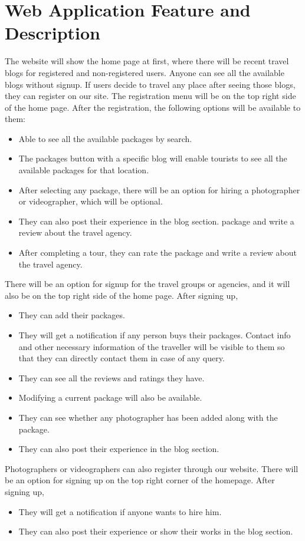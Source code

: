 \documentclass[12pt,a4paper,twoside,openright]{report}
\begin{document}
\section*{Web Application Feature and Description}
The website will show the home page at first, where there will be recent travel blogs for registered and non-registered users. Anyone can see all the available blogs without signup. If users decide to travel any place after seeing those blogs, they can register on our site. The registration menu will be on the top right side of the home page. After the registration, the following options will be available to them:
\begin{itemize}
\item Able to see all the available packages by search.
\item The packages button with a specific blog will enable tourists to see all the available packages for that location.
\item 	After selecting any package, there will be an option for hiring a photographer or        
       videographer, which will be optional.

\item They can also post their experience in the blog section. package and write a review about the travel agency.
\item After completing a tour, they can rate the package and write a review about the travel agency.

\end{itemize}
There will be an option for signup for the travel groups or agencies, and it will also be on the top right side of the home page. After signing up,
\begin{itemize}
\item They can add their packages.
\item	They will get a notification if any person buys their packages. Contact info and other necessary information of the traveller will be visible to them so that they can directly contact them in case of any query.
\item They can see all the reviews and ratings they have.
\item Modifying a current package will also be available.
\item They can see whether any photographer has been added along with the package.
\item They can also post their experience in the blog section.
\end{itemize}
Photographers or videographers can also register through our website. There will be an option for signing up on the top right corner of the homepage. After signing up,
\begin{itemize}
\item They will get a notification if anyone wants to hire him.
\item They can also post their experience or show their works in the blog section.
\end{itemize}
\newpage
\end{document}
